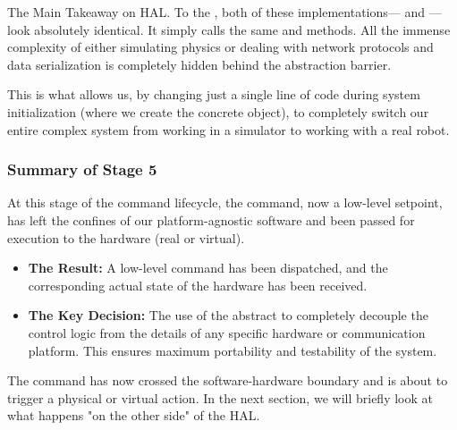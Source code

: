 \begin{principlebox}{The Main Takeaway on HAL.}
    To the , both of these implementations— and —look absolutely identical. It simply calls the same  and  methods. All the immense complexity of either simulating physics or dealing with network protocols and data serialization is completely hidden behind the abstraction barrier.
    
    This is what allows us, by changing just a single line of code during system initialization (where we create the concrete object), to completely switch our entire complex system from working in a simulator to working with a real robot.
\end{principlebox}

\subsubsection{Summary of Stage 5}
\label{subsubsec:stage5_summary}
At this stage of the command lifecycle, the command, now a low-level setpoint, has left the confines of our platform-agnostic software and been passed for execution to the hardware (real or virtual).
\begin{itemize}
    \item \textbf{The Result:} A low-level command has been dispatched, and the corresponding actual state of the hardware has been received.
    \item \textbf{The Key Decision:} The use of the abstract  to completely decouple the control logic from the details of any specific hardware or communication platform. This ensures maximum portability and testability of the system.
\end{itemize}

The command has now crossed the software-hardware boundary and is about to trigger a physical or virtual action. In the next section, we will briefly look at what happens "on the other side" of the HAL.













